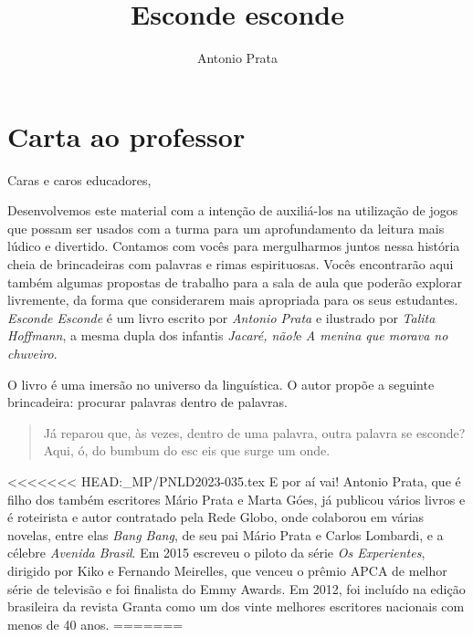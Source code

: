 \documentclass[11pt]{extarticle}
\newcommand{\AutorLivro}{Antonio Prata}
\newcommand{\TituloLivro}{Esconde esconde}
\newcommand{\colaborador}{Gabriela Karam}
\begin{document}
\title{\TituloLivro}
\author{\AutorLivro}
\def\authornotes{\colaborador}

\date{}
\maketitle


\tableofcontents

\section{Carta ao professor}

Caras e caros educadores,

Desenvolvemos este material com a intenção de auxiliá-los na utilização de jogos que possam ser usados com a turma para um aprofundamento da leitura mais lúdico e divertido. Contamos com vocês para mergulharmos juntos nessa história cheia de brincadeiras com palavras e rimas espirituosas. Vocês encontrarão aqui também algumas propostas de trabalho para a sala de aula que poderão explorar livremente, da forma que considerarem mais apropriada para os seus estudantes. \textit{Esconde Esconde} é um livro escrito por \textit{Antonio Prata} e ilustrado por \textit{Talita Hoffmann}, a mesma dupla dos infantis \textit{Jacaré, não!}e \textit{A menina que morava no chuveiro}. 


O livro é uma imersão no universo da linguística. O autor propõe a seguinte brincadeira: procurar palavras dentro de palavras.

\begin{quote}

Já reparou que, às vezes, dentro de uma palavra, outra palavra se esconde? Aqui, ó, do bumbum do esc eis que surge um onde. 


\end{quote}

<<<<<<< HEAD:_MP/PNLD2023-035.tex
E por aí vai! Antonio Prata, que é  filho dos também escritores Mário Prata e Marta Góes, já publicou vários livros e é roteirista e autor contratado pela Rede Globo, onde colaborou em várias novelas, entre elas \textit{Bang Bang}, de seu pai Mário Prata e Carlos Lombardi, e a célebre \textit{Avenida Brasil}. Em 2015 escreveu o piloto da série \textit{Os Experientes}, dirigido por Kiko e Fernando Meirelles, que venceu o prêmio APCA de melhor série de televisão e foi finalista do Emmy Awards. Em 2012, foi incluído na edição brasileira da revista Granta como um dos vinte melhores escritores nacionais com menos de 40 anos.
=======
\end{document}
